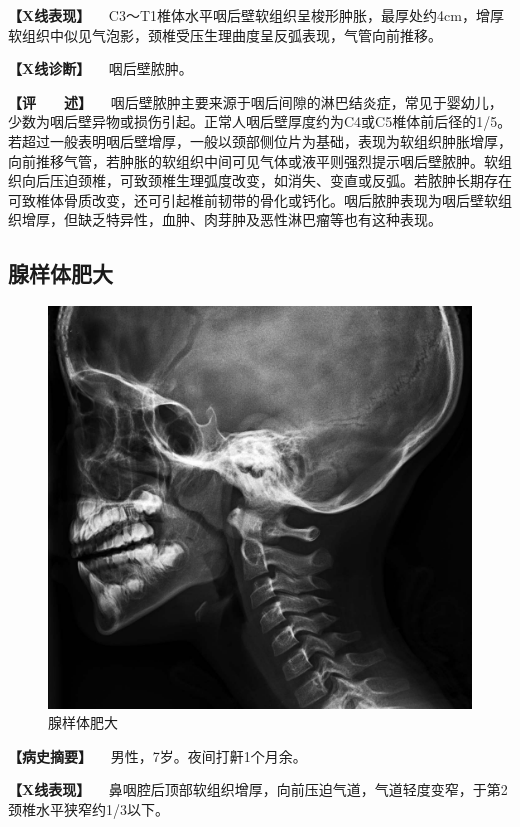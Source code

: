 \textbf{【X线表现】}
　C3～T1椎体水平咽后壁软组织呈梭形肿胀，最厚处约4cm，增厚软组织中似见气泡影，颈椎受压生理曲度呈反弧表现，气管向前推移。

\textbf{【X线诊断】} 　咽后壁脓肿。

\textbf{【评　　述】}
　咽后壁脓肿主要来源于咽后间隙的淋巴结炎症，常见于婴幼儿，少数为咽后壁异物或损伤引起。正常人咽后壁厚度约为C4或C5椎体前后径的1/5。若超过一般表明咽后壁增厚，一般以颈部侧位片为基础，表现为软组织肿胀增厚，向前推移气管，若肿胀的软组织中间可见气体或液平则强烈提示咽后壁脓肿。软组织向后压迫颈椎，可致颈椎生理弧度改变，如消失、变直或反弧。若脓肿长期存在可致椎体骨质改变，还可引起椎前韧带的骨化或钙化。咽后脓肿表现为咽后壁软组织增厚，但缺乏特异性，血肿、肉芽肿及恶性淋巴瘤等也有这种表现。

\subsection{腺样体肥大}

\begin{figure}[!htbp]
 \centering
 \includegraphics{./images/Image00435.jpg}
 \captionsetup{justification=centering}
 \caption{腺样体肥大}
 \label{fig7-5-2}
  \end{figure} 

\textbf{【病史摘要】} 　男性，7岁。夜间打鼾1个月余。

\textbf{【X线表现】}
　鼻咽腔后顶部软组织增厚，向前压迫气道，气道轻度变窄，于第2颈椎水平狭窄约1/3以下。

